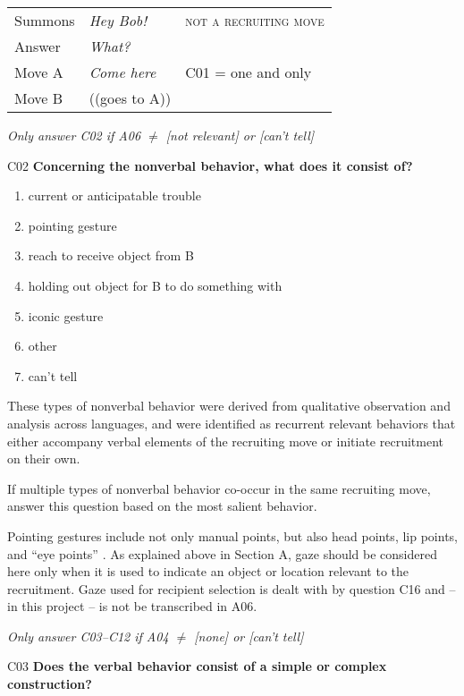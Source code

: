 \documentclass[output=paper]{langsci/langscibook}
\begin{document}
\begin{description}
\begin{tabular}{l l l }
Summons  & \textit{Hey Bob!} &  \textsc{not a recruiting move}\\
Answer & \textit{What?} &  \\
Move A &  \textit{Come here} & C01 = one and only \\
Move B & ((goes to A)) & \\
\end{tabular}

\smallskip

\item
\textit{Only answer C02 if A06 ${\neq}$ [not relevant] or [can’t tell]}

\item
C02   \textbf{Concerning the nonverbal behavior, what does it consist of?}

\begin{enumerate}
\item current or anticipatable trouble
\item pointing gesture
\item reach to receive object from B
\item holding out object for B to do something with
\item iconic gesture
\item other
\item can’t tell
\end{enumerate}
These types of nonverbal behavior were derived from qualitative observation and analysis across languages, and were identified as recurrent relevant behaviors that either accompany verbal elements of the recruiting move or initiate recruitment on their own.

If multiple types of nonverbal behavior co-occur in the same recruiting move, answer this question based on the most salient behavior.

Pointing gestures include not only manual points, but also head points, lip points, and “eye points” \citep{Wilkins2003}. As explained above in Section A, gaze should be considered here only when it is used to indicate an object or location relevant to the recruitment. Gaze used for recipient selection \citep{Lerner2003} is dealt with by question C16 and -- in this project -- is not be transcribed in A06.

\smallskip

\item
\textit{Only answer C03--C12 if A04 ${\neq}$ [none] or [can’t tell]}

\newpage
\item
C03  \textbf{Does the verbal behavior consist of a simple or complex construction?}


\end{description}
\end{document}
